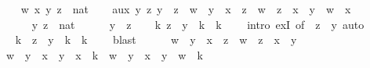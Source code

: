 \begin{isabellebody}
\ \ \isamarkupfalse%
\ w\ x\ y\ z\ {\isacharcolon}{\kern0pt}{\isacharcolon}{\kern0pt}\ nat\isanewline
\ \ \isamarkupfalse%
\ aux{\isacharcolon}{\kern0pt}\ {\isachardoublequoteopen}{\isasymAnd}y\ z{\isachardot}{\kern0pt}\ y\ {\isacharless}{\kern0pt}\ z\ {\isasymLongrightarrow}\ w\ {\isacharasterisk}{\kern0pt}\ y\ {\isacharplus}{\kern0pt}\ x\ {\isacharasterisk}{\kern0pt}\ z\ {\isacharequal}{\kern0pt}\ w\ {\isacharasterisk}{\kern0pt}\ z\ {\isacharplus}{\kern0pt}\ x\ {\isacharasterisk}{\kern0pt}\ y\ {\isasymLongrightarrow}\ w\ {\isacharequal}{\kern0pt}\ x{\isachardoublequoteclose}\isanewline
\ \ \isamarkupfalse%
\ {\isacharminus}{\kern0pt}\isanewline
\ \ \ \ \isamarkupfalse%
\ y\ z\ {\isacharcolon}{\kern0pt}{\isacharcolon}{\kern0pt}\ nat\isanewline
\ \ \ \ \isamarkupfalse%
\ {\isachardoublequoteopen}y\ {\isacharless}{\kern0pt}\ z{\isachardoublequoteclose}\ \isamarkupfalse%
\ \isamarkupfalse%
\ {\isachardoublequoteopen}{\isasymexists}k{\isachardot}{\kern0pt}\ z\ {\isacharequal}{\kern0pt}\ y\ {\isacharplus}{\kern0pt}\ k\ {\isasymand}\ k\ {\isasymnoteq}\ {}{\isachardoublequoteclose}\ \isamarkupfalse%
\ {\isacharparenleft}{\kern0pt}intro\ exI\ {\isacharbrackleft}{\kern0pt}of\ {\isacharunderscore}{\kern0pt}\ {\isachardoublequoteopen}z\ {\isacharminus}{\kern0pt}\ y{\isachardoublequoteclose}{\isacharbrackright}{\kern0pt}{\isacharparenright}{\kern0pt}\ auto\isanewline
\ \ \ \ \isamarkupfalse%
\ \isamarkupfalse%
\ k\ \ {\isachardoublequoteopen}z\ {\isacharequal}{\kern0pt}\ y\ {\isacharplus}{\kern0pt}\ k{\isachardoublequoteclose}\ \ {\isachardoublequoteopen}k\ {\isasymnoteq}\ {}{\isachardoublequoteclose}\ \isamarkupfalse%
\ blast\isanewline
\ \ \ \ \isamarkupfalse%
\ {\isachardoublequoteopen}w\ {\isacharasterisk}{\kern0pt}\ y\ {\isacharplus}{\kern0pt}\ x\ {\isacharasterisk}{\kern0pt}\ z\ {\isacharequal}{\kern0pt}\ w\ {\isacharasterisk}{\kern0pt}\ z\ {\isacharplus}{\kern0pt}\ x\ {\isacharasterisk}{\kern0pt}\ y{\isachardoublequoteclose}\isanewline
\ \ \ \ \isamarkupfalse%
\ \isamarkupfalse%
\ {\isachardoublequoteopen}{\isacharparenleft}{\kern0pt}w\ {\isacharasterisk}{\kern0pt}\ y\ {\isacharplus}{\kern0pt}\ x\ {\isacharasterisk}{\kern0pt}\ y{\isacharparenright}{\kern0pt}\ {\isacharplus}{\kern0pt}\ x\ {\isacharasterisk}{\kern0pt}\ k\ {\isacharequal}{\kern0pt}\ {\isacharparenleft}{\kern0pt}w\ {\isacharasterisk}{\kern0pt}\ y\ {\isacharplus}{\kern0pt}\ x\ {\isacharasterisk}{\kern0pt}\ y{\isacharparenright}{\kern0pt}\ {\isacharplus}{\kern0pt}\ w\ {\isacharasterisk}{\kern0pt}\ k{\isachardoublequoteclose}\ \isamarkupfalse%

\end{isabellebody}
